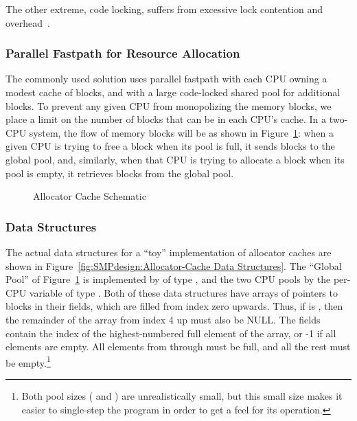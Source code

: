 The other extreme, code locking, suffers from excessive lock contention
and overhead~\cite{McKenney93}.
\fi

\subsubsection{Parallel Fastpath for Resource Allocation}

The commonly used solution uses parallel fastpath with each CPU
owning a modest cache of blocks, and with a large code-locked
shared pool for additional blocks.
To prevent any given CPU from monopolizing the memory blocks,
we place a limit on the number of blocks that can be in each CPU's
cache.
In a two-CPU system, the flow of memory blocks will be as shown
in Figure~\ref{fig:SMPdesign:Allocator Cache Schematic}:
when a given CPU is trying to free a block when its pool is full,
it sends blocks to the global pool, and, similarly, when that CPU
is trying to allocate a block when its pool is empty, it retrieves
blocks from the global pool.

\begin{figure}[htb]
\begin{center}
\end{center}
\caption{Allocator Cache Schematic}
\label{fig:SMPdesign:Allocator Cache Schematic}
\end{figure}

\subsubsection{Data Structures}

The actual data structures for a ``toy'' implementation of allocator
caches are shown in
Figure~\ref{fig:SMPdesign:Allocator-Cache Data Structures}.
The ``Global Pool'' of Figure~\ref{fig:SMPdesign:Allocator Cache Schematic}
is implemented by  of type ,
and the two CPU pools by the per-CPU variable  of
type .
Both of these data structures have arrays of pointers to blocks
in their  fields, which are filled from index zero upwards.
Thus, if  is , then the remainder of
the array from index 4 up must also be NULL.
The  fields contain the index of the highest-numbered full
element of the  array, or -1 if all elements are empty.
All elements from  through
 must be full, and all the rest
must be empty.\footnote{
	Both pool sizes ( and
	) are unrealistically small, but this small
	size makes it easier to single-step the program in order to get
	a feel for its operation.}

